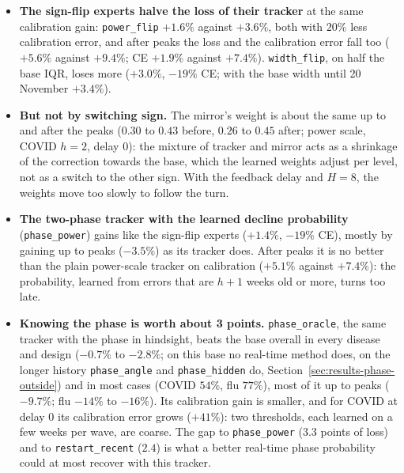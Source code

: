 \documentclass[11pt,a4paper]{article}
\theoremstyle{definition}
\theoremstyle{remark}
\begin{document}
\begin{itemize}[leftmargin=*,itemsep=3pt]
\item \textbf{The sign-flip experts halve the loss of their tracker} at
the same calibration gain: \texttt{power\_flip} $+1.6\%$ against $+3.6\%$,
both with $20\%$ less calibration error, and after peaks the loss and the
calibration error fall too ($+5.6\%$ against $+9.4\%$; CE $+1.9\%$ against
$+7.4\%$). \texttt{width\_flip}, on half the base IQR, loses more
($+3.0\%$, $-19\%$ CE; with the base width until 20 November $+3.4\%$).
\item \textbf{But not by switching sign.} The mirror's weight is about the
same up to and after the peaks ($0.30$ to $0.43$ before, $0.26$ to $0.45$
after; power scale, COVID $h=2$, delay 0): the mixture of tracker and
mirror acts as a shrinkage of the correction towards the base, which the
learned weights adjust per level, not as a switch to the other sign. With
the feedback delay and $H=8$, the weights move too slowly to follow the
turn.
\item \textbf{The two-phase tracker with the learned decline probability}
(\texttt{phase\_power}) gains like the sign-flip experts ($+1.4\%$,
$-19\%$ CE), mostly by gaining up to peaks ($-3.5\%$) as its tracker does.
After peaks it is no better than the plain power-scale tracker on
calibration ($+5.1\%$ against $+7.4\%$): the probability, learned from
errors that are $h+1$ weeks old or more, turns too late.
\item \textbf{Knowing the phase is worth about 3 points.}
\texttt{phase\_oracle}, the same tracker with the phase in hindsight,
beats the base overall in every disease and design ($-0.7\%$ to $-2.8\%$;
on this base no real-time method does, on the longer history
\texttt{phase\_angle} and \texttt{phase\_hidden} do,
Section~\ref{sec:results-phase-outside}) and in most cases (COVID $54\%$,
flu $77\%$), most of it up to peaks ($-9.7\%$; flu $-14\%$ to $-16\%$). Its
calibration gain is smaller, and for COVID at delay 0 its calibration error
grows ($+41\%$): two thresholds, each learned on a few weeks per wave, are
coarse. The gap to \texttt{phase\_power} ($3.3$ points of loss) and to
\texttt{restart\_recent} ($2.4$) is what a better real-time phase
probability could at most recover with this tracker.
\end{itemize}
\end{document}
